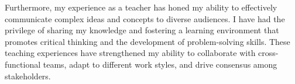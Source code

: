 \documentclass[11pt, a4paper]{awesome-cv}
\begin{document}
\begin{cvletter}
	Furthermore, my experience as a teacher has honed my ability to effectively communicate complex ideas and concepts to diverse audiences. I have had the privilege of sharing my knowledge and fostering a learning environment that promotes critical thinking and the development of problem-solving skills. These teaching experiences have strengthened my ability to collaborate with cross-functional teams, adapt to different work styles, and drive consensus among stakeholders.
\end{cvletter}


\makeletterclosing{}
\end{document}
